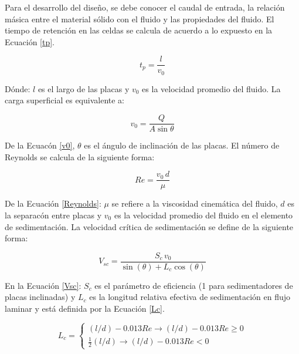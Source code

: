 \noindent
\justify

Para el desarrollo del dise\~no, se debe conocer el caudal de entrada, la relaci\'on m\'asica entre el material s\'olido con el fluido y las propiedades del fluido. El tiempo de retenci\'on en las celdas se calcula de acuerdo a lo expuesto en la Ecuaci\'on \ref{tp}.

\begin{equation}
	t_p = \frac{l}{v_0}
	\label{tp}
\end{equation}

\noindent
\justify

D\'onde: $l$ es el largo de las placas y $v_0$ es la velocidad promedio del fluido. La carga superficial es equivalente a:

\begin{equation}
	v_0 = \frac{Q}{A \sin \theta}
	\label{v0}
\end{equation}

\noindent
\justify

De la Ecuac\'on \ref{v0}, $\theta$ es el \'angulo de inclinaci\'on de las placas. El n\'umero de Reynolds se calcula de la siguiente forma:

\begin{equation}
	Re = \frac{v_0 \, d}{\mu}
	\label{Reynolds}
\end{equation}

\noindent
\justify

De la Ecuaci\'on \ref{Reynolds}: $\mu$ se refiere a la viscosidad cinem\'atica del fluido, $d$ es la separac\'on entre placas y $v_0$ es la velocidad promedio del fluido en el elemento de sedimentaci\'on. La velocidad cr\'itica de sedimentaci\'on se define de la siguiente forma:

\begin{equation}
	V_{sc} = \frac{S_c \, v_0}{\sin (\theta ) + L_c \cos (\theta )}
	\label{Vsc}
\end{equation}

\noindent
\justify

En la Ecuaci\'on \ref{Vsc}: $S_c$ es el par\'ametro de eficiencia (1 para sedimentadores de placas inclinadas) y $L_c$ es la longitud relativa efectiva de sedimentaci\'on en flujo laminar y est\'a definida por la Ecuaci\'on \ref{Lc}.

\begin{equation}
	L_c = \left\{\begin{matrix}
		(l/d) - 0.013 Re \rightarrow (l/d) - 0.013 Re \ge 0 \\
		\frac{1}{2} (l/d) \rightarrow (l/d) - 0.013 Re < 0
	\end{matrix}\right.
	\label{Lc}
\end{equation}

